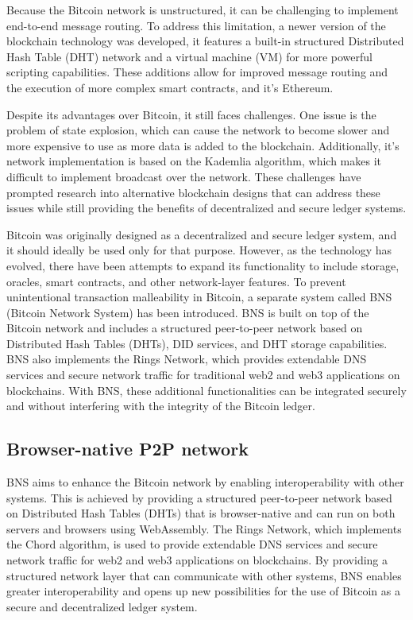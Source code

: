 \documentclass[twocolumn]{article}
\begin{document}
Because the Bitcoin network is unstructured, it can be challenging to implement end-to-end message routing\cite{bano2017consensus}. To address this limitation, a newer version of the blockchain technology was developed, it features a built-in structured Distributed Hash Table (DHT) network and a virtual machine (VM) for more powerful scripting capabilities\cite{wood2014ethereum}. These additions allow for improved message routing and the execution of more complex smart contracts\cite{buterin2014ethereum}, and it's Ethereum.

Despite its advantages over Bitcoin, it still faces challenges. One issue is the problem of state explosion, which can cause the network to become slower and more expensive to use as more data is added to the blockchain\cite{wood2014ethereum}. Additionally, it's network implementation is based on the Kademlia algorithm, which makes it difficult to implement broadcast over the network\cite{gervais2016security}. These challenges have prompted research into alternative blockchain designs that can address these issues while still providing the benefits of decentralized and secure ledger systems.

Bitcoin was originally designed as a decentralized and secure ledger system, and it should ideally be used only for that purpose. However, as the technology has evolved, there have been attempts to expand its functionality to include storage, oracles, smart contracts, and other network-layer features. To prevent unintentional transaction malleability in Bitcoin, a separate system called BNS (Bitcoin Network System) has been introduced. BNS is built on top of the Bitcoin network and includes a structured peer-to-peer network based on Distributed Hash Tables (DHTs), DID services, and DHT storage capabilities. BNS also implements the Rings Network, which provides extendable DNS services and secure network traffic for traditional web2 and web3 applications on blockchains. With BNS, these additional functionalities can be integrated securely and without interfering with the integrity of the Bitcoin ledger.

\subsection{Browser-native P2P network}

BNS aims to enhance the Bitcoin network by enabling interoperability with other systems. This is achieved by providing a structured peer-to-peer network based on Distributed Hash Tables (DHTs) that is browser-native and can run on both servers and browsers using WebAssembly. The Rings Network, which implements the Chord algorithm, is used to provide extendable DNS services and secure network traffic for web2 and web3 applications on blockchains. By providing a structured network layer that can communicate with other systems, BNS enables greater interoperability and opens up new possibilities for the use of Bitcoin as a secure and decentralized ledger system.
\end{document}
